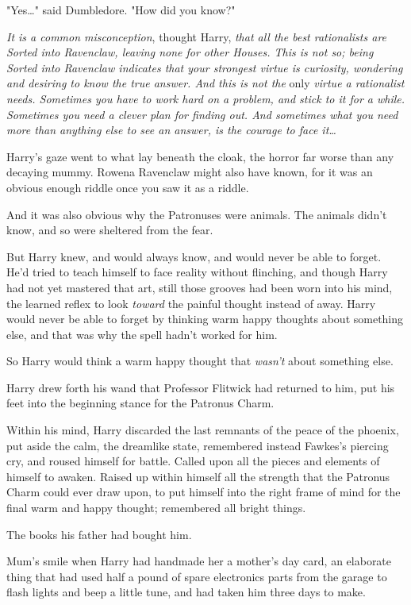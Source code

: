 "Yes{\ldots}" said Dumbledore. "How did you know?"

\emph{It is a common misconception}, thought Harry, \emph{that all the best 
rationalists are Sorted into Ravenclaw, leaving none for other Houses. This is 
not so; being Sorted into Ravenclaw indicates that your strongest virtue is 
curiosity, wondering and desiring to know the true answer. And this is not the} 
only \emph{virtue a rationalist needs. Sometimes you have to work hard on a 
problem, and stick to it for a while. Sometimes you need a clever plan for 
finding out. And sometimes what you need more than anything else to see an 
answer, is the courage to face it{\ldots}}

Harry's gaze went to what lay beneath the cloak, the horror far worse than any 
decaying mummy. Rowena Ravenclaw might also have known, for it was an obvious 
enough riddle once you saw it as a riddle.

And it was also obvious why the Patronuses were animals. The animals didn't 
know, and so were sheltered from the fear.

But Harry knew, and would always know, and would never be able to forget. He'd 
tried to teach himself to face reality without flinching, and though Harry had 
not yet mastered that art, still those grooves had been worn into his mind, the 
learned reflex to look \emph{toward} the painful thought instead of away. Harry 
would never be able to forget by thinking warm happy thoughts about something 
else, and that was why the spell hadn't worked for him.

So Harry would think a warm happy thought that \emph{wasn't} about something 
else.

Harry drew forth his wand that Professor Flitwick had returned to him, put his 
feet into the beginning stance for the Patronus Charm.

Within his mind, Harry discarded the last remnants of the peace of the phoenix, 
put aside the calm, the dreamlike state, remembered instead Fawkes's piercing 
cry, and roused himself for battle. Called upon all the pieces and elements of 
himself to awaken. Raised up within himself all the strength that the Patronus 
Charm could ever draw upon, to put himself into the right frame of mind for the 
final warm and happy thought; remembered all bright things.

The books his father had bought him.

Mum's smile when Harry had handmade her a mother's day card, an elaborate thing 
that had used half a pound of spare electronics parts from the garage to flash 
lights and beep a little tune, and had taken him three days to make.

